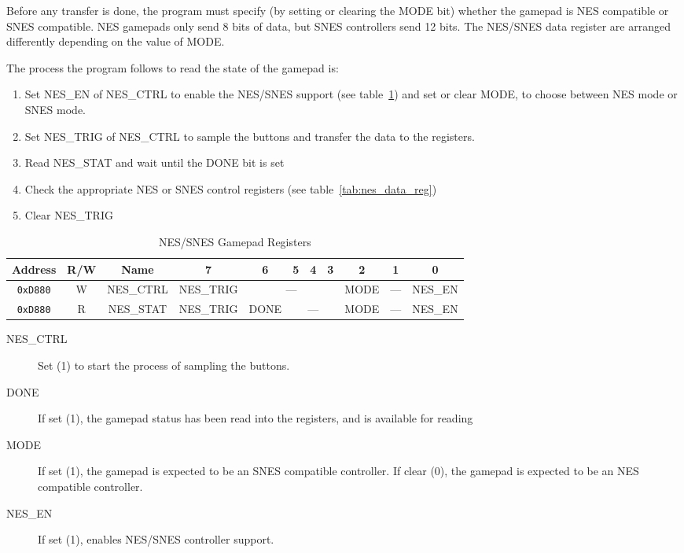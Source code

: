 Before any transfer is done, the program must specify (by setting or clearing the MODE bit) whether the gamepad is NES compatible or SNES compatible. NES gamepads only send 8 bits of data, but SNES controllers send 12 bits. The NES/SNES data register are arranged differently depending on the value of MODE.

The process the program follows to read the state of the gamepad is:

\begin{enumerate}
    \item Set NES\_EN of NES\_CTRL to enable the NES/SNES support (see table~\ref{tab:nes_registers}) and set or clear MODE, to choose between NES mode or SNES mode.
    \item Set NES\_TRIG of NES\_CTRL to sample the buttons and transfer the data to the registers.
    \item Read NES\_STAT and wait until the DONE bit is set
    \item Check the appropriate NES or SNES control registers (see table~\ref{tab:nes_data_reg})
    \item Clear NES\_TRIG
\end{enumerate}

\begin{table}[ht]
    \begin{center}
        \begin{tabular}{|c|c|c|c|c|c|c|c|c|c|c|} \hline
            Address & R/W & Name & 7 & 6 & 5 & 4 & 3 & 2 & 1 & 0 \\\hline\hline
            \verb+0xD880+ & W & NES\_CTRL & NES\_TRIG & \multicolumn{4}{|c|}{---} & MODE & --- & NES\_EN \\ \hline
            \verb+0xD880+ & R & NES\_STAT & NES\_TRIG & DONE & \multicolumn{3}{|c|}{---} & MODE & --- & NES\_EN \\ \hline
        \end{tabular}
    \end{center}
    \caption{NES/SNES Gamepad Registers}
    \label{tab:nes_registers}
\end{table}

\begin{description}
    \item[NES\_CTRL] Set (1) to start the process of sampling the buttons.
    \item[DONE] If set (1), the gamepad status has been read into the registers, and is available for reading
    \item[MODE] If set (1), the gamepad is expected to be an SNES compatible controller. If clear (0), the gamepad is expected to be an NES compatible controller.
    \item[NES\_EN] If set (1), enables NES/SNES controller support.
\end{description}

